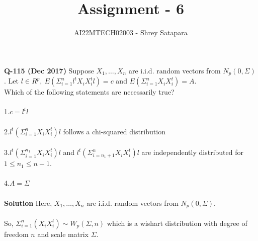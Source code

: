 \documentclass[journal,12pt,twocolumn]{IEEEtran}
\begin{document}
\let\StandardTheFigure\thefigure
\let\vec\mathbf
\renewcommand{\thefigure}{\theproblem}



\def\putbox#1#2#3{\makebox[0in][l]{\makebox[#1][l]{}\raisebox{\baselineskip}[0in][0in]{\raisebox{#2}[0in][0in]{#3}}}}
     \def\rightbox#1{\makebox[0in][r]{#1}}
     \def\centbox#1{\makebox[0in]{#1}}
     \def\topbox#1{\raisebox{-\baselineskip}[0in][0in]{#1}}
     \def\midbox#1{\raisebox{-0.5\baselineskip}[0in][0in]{#1}}

\vspace{3cm}

\title{
Assignment - 6
}
\author{AI22MTECH02003 - Shrey Satapara}	


\maketitle


\textbf{Q-115 (Dec 2017)}
Suppose \(X_1,\dots,X_n\) are i.i.d. random vectors from \(N_p(0,\Sigma)\). Let \(l \in R^p,\:E(\Sigma_{i=1}^nl^tX_iX_i^tl)=c\) and \(E(\Sigma_{i=1}^nX_iX_i^t)=A\).\\ Which of the following statements are necessarily true?
\\\\
1.\quad\(c = l^tl\) \\\\
2.\quad\(l^t(\Sigma_{i=1}^nX_iX_i^t)l\) follows a chi-squared distribution\\\\
3.\quad\(l^t(\Sigma_{i=1}^{n_1}X_iX_i^t)l\) and \(l^t(\Sigma_{i={n_1+1}}^nX_iX_i^t)l\) are independently distributed for \(1\leq n_1\leq n-1\).\\\\
4.\quad\(A=\Sigma\)\\\\

\textbf{Solution}
Here, \(X_1,\dots,X_n\) are i.i.d. random vectors from \(N_p(0,\Sigma)\).\\\\
So, \(\Sigma_{i=1}^n(X_iX_i^t)\sim W_p(\Sigma,n)\) which is a wishart distribution with degree of freedom \(n\) and scale matrix \(\Sigma\).\\
\end{document}
